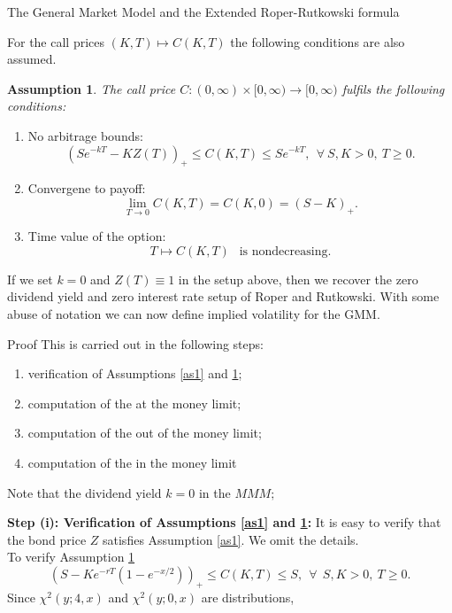\documentclass[unknownkeysallowed, compress]{beamer}
\theoremstyle{plain}
\newtheorem{assumption}[theorem]{\textbf{Assumption}}
\begin{document}
\begin{frame}[allowframebreaks]{The General Market Model and the Extended Roper-Rutkowski formula}
\begin{enumerate}
\begin{equation}
\end{equation}
For the call prices $(K,T)\mapsto C(K,T)$ the following conditions are also assumed.
\end{enumerate}
\begin{assumption}\cite[pg.~10]{guo2011small}\label{as2}
The call price $C:(0,\infty)\times [0,\infty)\rightarrow[0,\infty)$ fulfils the following conditions:
\end{assumption}
\begin{enumerate}
\item[(C1)] No arbitrage bounds:
\begin{equation}\label{neww16}
(Se^{-kT} - KZ(T))_+\leq C(K,T)\leq Se^{-kT},~~\forall~ S,K>0,~T\geq 0.
\end{equation}
\item[(C2)] Convergene to payoff:
\begin{equation}\label{neww17}
\lim_{T\rightarrow0}C(K,T) = C(K,0) = (S-K)_+.
\end{equation}
\item[(C3)] Time value of the option:
\begin{equation}\label{neww18}
T\mapsto C(K,T) ~~\mbox{  is nondecreasing}.
\end{equation}
\end{enumerate}
If we set $k=0$ and $Z(T) \equiv 1$ in the setup above, then we recover the zero dividend yield and zero interest rate setup of Roper and Rutkowski. With some abuse of notation we can now define implied volatility for the GMM.




\begin{block}{Proof\cite[pg.~10]{guo2011small}}
This is carried out in the following steps:

\begin{enumerate}
\item[(i)] verification of Assumptions \ref{as1} and \ref{as2};
\item[(ii)] computation of the at the money limit;
\item[(iii)] computation of the out of the money limit;
\item[(iv)] computation of the in the money limit
\end{enumerate}
Note that the dividend yield $k = 0$ in the $MMM;$
\end{block}
\textbf{Step (i): Verification of Assumptions \ref{as1} and \ref{as2}:} It is easy to verify that the bond price $Z$ satisfies Assumption \ref{as1}. We omit the details.\\
To verify Assumption \ref{as2}
$$
(S - Ke^{-rT}(1-e^{-x/2}))_+\leq C(K,T)\leq S,~~\forall~~ S,K>0,~T\geq 0.
$$
Since $\chi^2(y;4,x)$ and $\chi^2(y;0,x)$  are distributions, %


\end{frame}
\end{document}
